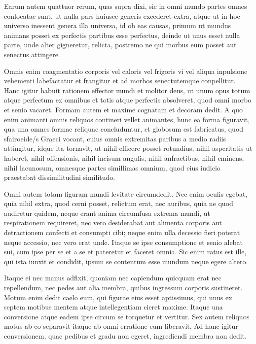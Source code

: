  Earum autem quattuor rerum, quas supra dixi, sic in omni mundo partes omnes conlocatae sunt, ut nulla pars huiusce generis excederet extra, atque ut in hoc universo inessent genera illa universa, id ob eas causas, primum ut mundus animans posset ex perfectis partibus esse perfectus, deinde ut unus esset nulla parte, unde alter gigneretur, relicta, postremo ne qui morbus eum posset aut senectus attingere.

 Omnis enim coagmentatio corporis vel caloris vel frigoris vi vel aliqua inpulsione vehementi labefactatur et frangitur et ad morbos senectutemque conpellitur. Hanc igitur habuit rationem effector mundi et molitor deus, ut unum opus totum atque perfectum ex omnibus et totis atque perfectis absolveret, quod omni morbo et senio vacaret. Formam autem et maxime cognatam et decoram dedit. A quo enim animanti omnis reliquos contineri vellet animantes, hunc ea forma figuravit, qua una omnes formae reliquae concluduntur, et globosum est fabricatus, quod sfairoeide/s Graeci vocant, cuius omnis extremitas paribus a medio radiis attingitur, idque ita tornavit, ut nihil efficere posset rotundius, nihil asperitatis ut haberet, nihil offensionis, nihil incisum angulis, nihil anfractibus, nihil eminens, nihil lacunosum, omnesque partes simillimas omnium, quod eius iudicio praestabat dissimilitudini similitudo.

 Omni autem totam figuram mundi levitate circumdedit. Nec enim oculis egebat, quia nihil extra, quod cerni posset, relictum erat, nec auribus, quia ne quod audiretur quidem, neque erant anima circumfusa extrema mundi, ut respirationem requireret, nec vero desiderabat aut alimenta corporis aut detractionem confecti et consumpti cibi; neque enim ulla decessio fieri poterat neque accessio, nec vero erat unde. Itaque se ipse consumptione et senio alebat sui, cum ipse per se et a se et pateretur et faceret omnia. Sic enim ratus est ille, qui ista iunxit et condidit, ipsum se contentum esse mundum neque egere altero.

 Itaque ei nec manus adfixit, quoniam nec capiendum quicquam erat nec repellendum, nec pedes aut alia membra, quibus ingressum corporis sustineret. Motum enim dedit caelo eum, qui figurae eius esset aptissimus, qui unus ex septem motibus mentem atque intellegentiam cieret maxime. Itaque una conversione atque eadem ipse circum se torquetur et vertitur. Sex autem reliquos motus ab eo separavit itaque ab omni erratione eum liberavit. Ad hanc igitur conversionem, quae pedibus et gradu non egeret, ingrediendi membra non dedit.

